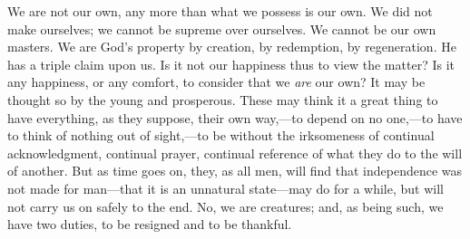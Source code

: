 We are not our own, any more than what we possess is our own. We
did not make ourselves; we cannot be supreme over ourselves. We cannot
be our own masters. We are God's property by creation, by redemption,
by regeneration. He has a triple claim upon us. Is it not our
happiness thus to view the matter? Is it any happiness, or any
comfort, to consider that we \emph{are} our own? It may be thought so
by the young and prosperous. These may think it a great thing to have
everything, as they suppose, their own way,—to depend on no one,—to
have to think of nothing out of sight,—to be without the irksomeness
of continual acknowledgment, continual prayer, continual reference of
what they do to the will of another. But as time goes on, they, as all
men, will find that independence was not made for man—that it is an
unnatural state—may do for a while, but will not carry us on safely
to the end. No, we are creatures; and, as being such, we have two
duties, to be resigned and to be thankful.

